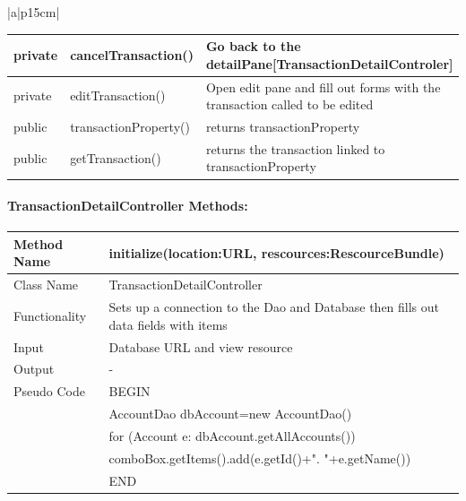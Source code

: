 \documentclass[12pt]{article}
\begin{document}
\begin{table}[H]
\begin{tabular}{|a|p{15cm}|}
\begin{tabular}{| p{1.5cm} | p{6.5cm} | p{5.9cm} |}
			\hline
			private &  cancelTransaction() & Go back to the detailPane[TransactionDetailControler]\\			
			\hline
			private &  editTransaction() & Open edit pane and fill out forms with the transaction called to be edited\\		
			\hline
			public &  transactionProperty() & returns transactionProperty\\		
			\hline
			public &  getTransaction() & returns the transaction linked to transactionProperty\\
			\hline			
		\end{tabular}								 
	\end{tabular}
\end{table}

\paragraph{TransactionDetailController Methods:}

\begin{tabular}{ |p{3cm}||p{\colWidth}|  }
	\hline
	Method Name &  initialize(location:URL, rescources:RescourceBundle) \\
	\hline
	Class Name & TransactionDetailController\\
	\hline
	Functionality & Sets up a connection to the Dao and Database then fills out data fields with items\\
	\hline
	Input & Database URL and view resource\\
	\hline
	Output & -\\
	\hline
	Pseudo Code & BEGIN\\
	& 		AccountDao dbAccount=new AccountDao() \\
	& 	for (Account e: dbAccount.getAllAccounts()) \\
	&		comboBox.getItems().add(e.getId()+". "+e.getName()) \\
	& END\\
	\hline
\end{tabular}  
\end{document}
